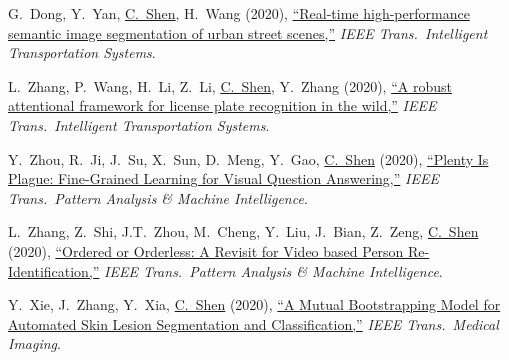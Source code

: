 \documentclass[9pt, a4paper]{article}
\newcommand{\years}[1]{\marginnote{\scriptsize #1}}
\def\highlight{\uline}
\begin{document}
\medskip

\years{2020} G.~Dong, Y.~Yan, \highlight{C.~Shen}, H.~Wang (2020),
\href{http://www.google.com/search?lr=&ie=UTF-8&oe=UTF-8&q=Real-time+high-performance+semantic+image+segmentation+of+urban+street+scenes+Genshun+Dong%2C+Yan+Yan%2C+Chunhua+Shen%2C+Hanzi+Wang}{``Real-time high-performance semantic image segmentation of urban street scenes,{}''}
\emph{IEEE Trans.\  Intelligent Transportation Systems}.

\medskip

\years{2020} L.~Zhang, P.~Wang, H.~Li, Z.~Li, \highlight{C.~Shen}, Y.~Zhang (2020),
\href{http://www.google.com/search?lr=&ie=UTF-8&oe=UTF-8&q=A+robust+attentional+framework+for+license+plate+recognition+in+the+wild+Linjiang+Zhang%2C+Peng+Wang%2C+Hui+Li%2C+Zhen+Li%2C+Chunhua+Shen%2C+Yanning+Zhang}{``A robust attentional framework for license plate recognition in the wild,{}''}
\emph{IEEE Trans.\  Intelligent Transportation Systems}.

\medskip

\years{2020} Y.~Zhou, R.~Ji, J.~Su, X.~Sun, D.~Meng, Y.~Gao, \highlight{C.~Shen} (2020),
\href{http://www.google.com/search?lr=&ie=UTF-8&oe=UTF-8&q=Plenty+Is+Plague%3A+Fine-Grained+Learning+for+Visual+Question+Answering+Yiyi+Zhou%2C+Rongrong+Ji%2C+Jinsong+Su%2C+Xiaoshuai+Sun%2C+Deyu+Meng%2C+Yue+Gao%2C+Chunhua+Shen}{``Plenty Is Plague: Fine-Grained Learning for Visual Question Answering,{}''}
\emph{IEEE Trans.\  Pattern Analysis \& Machine Intelligence}.

\medskip

\years{2020} L.~Zhang, Z.~Shi, J.T.~Zhou, M.~Cheng, Y.~Liu, J.~Bian, Z.~Zeng, \highlight{C.~Shen} (2020),
\href{http://www.google.com/search?lr=&ie=UTF-8&oe=UTF-8&q=Ordered+or+Orderless%3A+A+Revisit+for+Video+based+Person+Re-Identification+Le+Zhang%2C+Zenglin+Shi%2C+Joey+Tianyi+Zhou%2C+Ming-Ming+Cheng%2C+Yun+Liu%2C+Jia-Wang+Bian%2C+Zeng+Zeng%2C+Chunhua+Shen}{``Ordered or Orderless: A Revisit for Video based Person Re-Identification,{}''}
\emph{IEEE Trans.\  Pattern Analysis \& Machine Intelligence}.

\medskip

\years{2020} Y.~Xie, J.~Zhang, Y.~Xia, \highlight{C.~Shen} (2020),
\href{http://www.google.com/search?lr=&ie=UTF-8&oe=UTF-8&q=A+Mutual+Bootstrapping+Model+for+Automated+Skin+Lesion+Segmentation+and+Classification+Yutong+Xie%2C+Jianpeng+Zhang%2C+Yong+Xia%2C+Chunhua+Shen}{``A Mutual Bootstrapping Model for Automated Skin Lesion Segmentation and Classification,{}''}
\emph{IEEE Trans.\  Medical Imaging}.
\end{document}
